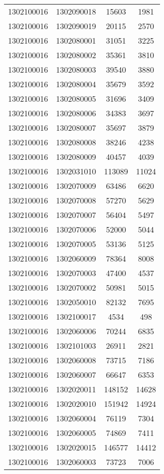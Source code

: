 \begin{longtable}[h]{llcc}
		1302100016 & 1302090018 & 15603 & 1981\\
		1302100016 & 1302090019 & 20115 & 2570\\
		1302100016 & 1302080001 & 31051 & 3225\\
		1302100016 & 1302080002 & 35361 & 3810\\
		1302100016 & 1302080003 & 39540 & 3880\\
		1302100016 & 1302080004 & 35679 & 3592\\
		1302100016 & 1302080005 & 31696 & 3409\\
		1302100016 & 1302080006 & 34383 & 3697\\
		1302100016 & 1302080007 & 35697 & 3879\\
		1302100016 & 1302080008 & 38246 & 4238\\
		1302100016 & 1302080009 & 40457 & 4039\\
		1302100016 & 1302031010 & 113089 & 11024\\
		1302100016 & 1302070009 & 63486 & 6620\\
		1302100016 & 1302070008 & 57270 & 5629\\
		1302100016 & 1302070007 & 56404 & 5497\\
		1302100016 & 1302070006 & 52000 & 5044\\
		1302100016 & 1302070005 & 53136 & 5125\\
		1302100016 & 1302060009 & 78364 & 8008\\
		1302100016 & 1302070003 & 47400 & 4537\\
		1302100016 & 1302070002 & 50981 & 5015\\
		1302100016 & 1302050010 & 82132 & 7695\\
		1302100016 & 1302100017 & 4534 & 498\\
		1302100016 & 1302060006 & 70244 & 6835\\
		1302100016 & 1302101003 & 26911 & 2821\\
		1302100016 & 1302060008 & 73715 & 7186\\
		1302100016 & 1302060007 & 66647 & 6353\\
		1302100016 & 1302020011 & 148152 & 14628\\
		1302100016 & 1302020010 & 151942 & 14924\\
		1302100016 & 1302060004 & 76119 & 7304\\
		1302100016 & 1302060005 & 74869 & 7411\\
		1302100016 & 1302020015 & 146577 & 14412\\
		1302100016 & 1302060003 & 73723 & 7006\\

\end{longtable}
